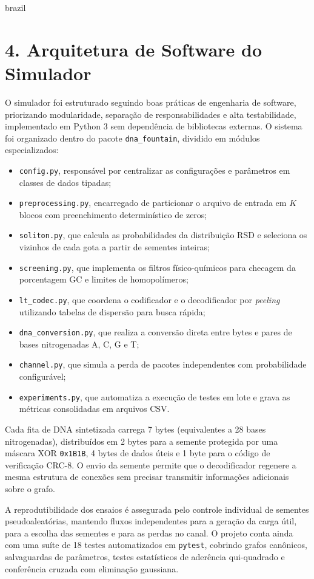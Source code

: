 \begin{resumo}
\begin{otherlanguage*}{brazil}
\section*{4. Arquitetura de Software do Simulador}

O simulador foi estruturado seguindo boas práticas de engenharia de software, priorizando modularidade, separação de responsabilidades e alta testabilidade, implementado em Python 3 sem dependência de bibliotecas externas. O sistema foi organizado dentro do pacote \texttt{dna\_fountain}, dividido em módulos especializados:
\begin{itemize}
    \item \texttt{config.py}, responsável por centralizar as configurações e parâmetros em classes de dados tipadas;
    \item \texttt{preprocessing.py}, encarregado de particionar o arquivo de entrada em $K$ blocos com preenchimento determinístico de zeros;
    \item \texttt{soliton.py}, que calcula as probabilidades da distribuição RSD e seleciona os vizinhos de cada gota a partir de sementes inteiras;
    \item \texttt{screening.py}, que implementa os filtros físico-químicos para checagem da porcentagem GC e limites de homopolímeros;
    \item \texttt{lt\_codec.py}, que coordena o codificador e o decodificador por \emph{peeling} utilizando tabelas de dispersão para busca rápida;
    \item \texttt{dna\_conversion.py}, que realiza a conversão direta entre bytes e pares de bases nitrogenadas A, C, G e T;
    \item \texttt{channel.py}, que simula a perda de pacotes independentes com probabilidade configurável;
    \item \texttt{experiments.py}, que automatiza a execução de testes em lote e grava as métricas consolidadas em arquivos CSV.
\end{itemize}

Cada fita de DNA sintetizada carrega 7 bytes (equivalentes a 28 bases nitrogenadas), distribuídos em 2 bytes para a semente protegida por uma máscara XOR \texttt{0x1B1B}, 4 bytes de dados úteis e 1 byte para o código de verificação CRC-8. O envio da semente permite que o decodificador regenere a mesma estrutura de conexões sem precisar transmitir informações adicionais sobre o grafo.

A reprodutibilidade dos ensaios é assegurada pelo controle individual de sementes pseudoaleatórias, mantendo fluxos independentes para a geração da carga útil, para a escolha das sementes e para as perdas no canal. O projeto conta ainda com uma suíte de 18 testes automatizados em \texttt{pytest}, cobrindo grafos canônicos, salvaguardas de parâmetros, testes estatísticos de aderência qui-quadrado e conferência cruzada com eliminação gaussiana.


\end{otherlanguage*}
\end{resumo}
